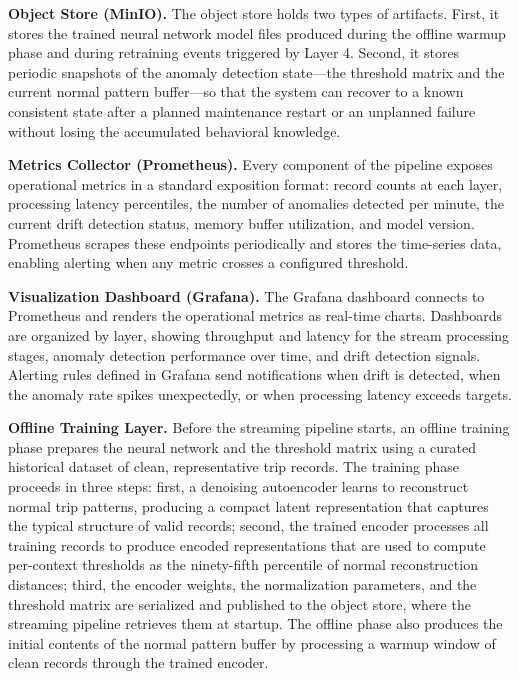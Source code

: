 \bigskip
\noindent\textbf{Object Store (MinIO).} The object store holds two types of artifacts. First, it stores the trained neural network model files produced during the offline warmup phase and during retraining events triggered by Layer 4. Second, it stores periodic snapshots of the anomaly detection state---the threshold matrix and the current normal pattern buffer---so that the system can recover to a known consistent state after a planned maintenance restart or an unplanned failure without losing the accumulated behavioral knowledge.

\bigskip
\noindent\textbf{Metrics Collector (Prometheus).} Every component of the pipeline exposes operational metrics in a standard exposition format: record counts at each layer, processing latency percentiles, the number of anomalies detected per minute, the current drift detection status, memory buffer utilization, and model version. Prometheus scrapes these endpoints periodically and stores the time-series data, enabling alerting when any metric crosses a configured threshold.

\bigskip
\noindent\textbf{Visualization Dashboard (Grafana).} The Grafana dashboard connects to Prometheus and renders the operational metrics as real-time charts. Dashboards are organized by layer, showing throughput and latency for the stream processing stages, anomaly detection performance over time, and drift detection signals. Alerting rules defined in Grafana send notifications when drift is detected, when the anomaly rate spikes unexpectedly, or when processing latency exceeds targets.

\bigskip
\noindent\textbf{Offline Training Layer.} Before the streaming pipeline starts, an offline training phase prepares the neural network and the threshold matrix using a curated historical dataset of clean, representative trip records. The training phase proceeds in three steps: first, a denoising autoencoder learns to reconstruct normal trip patterns, producing a compact latent representation that captures the typical structure of valid records; second, the trained encoder processes all training records to produce encoded representations that are used to compute per-context thresholds as the ninety-fifth percentile of normal reconstruction distances; third, the encoder weights, the normalization parameters, and the threshold matrix are serialized and published to the object store, where the streaming pipeline retrieves them at startup. The offline phase also produces the initial contents of the normal pattern buffer by processing a warmup window of clean records through the trained encoder.


